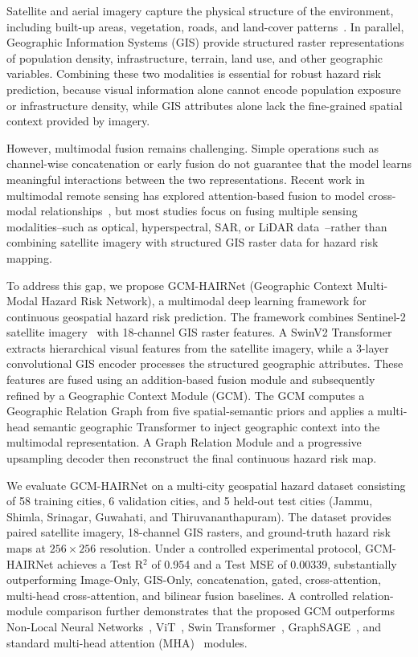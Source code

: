 \documentclass[sigconf, review=true]{acmart}
\begin{document}
Satellite and aerial imagery capture the physical structure of the environment, including built-up areas, vegetation, roads, and land-cover patterns~\cite{drusch2012sentinel}. In parallel, Geographic Information Systems (GIS) provide structured raster representations of population density, infrastructure, terrain, land use, and other geographic variables. Combining these two modalities is essential for robust hazard risk prediction, because visual information alone cannot encode population exposure or infrastructure density, while GIS attributes alone lack the fine-grained spatial context provided by imagery.

However, multimodal fusion remains challenging. Simple operations such as channel-wise concatenation or early fusion do not guarantee that the model learns meaningful interactions between the two representations. Recent work in multimodal remote sensing has explored attention-based fusion to model cross-modal relationships~\cite{bahaduri2024multimodal}, but most studies focus on fusing multiple sensing modalities--such as optical, hyperspectral, SAR, or LiDAR data~\cite{samadzadegan2025fusion}--rather than combining satellite imagery with structured GIS raster data for hazard risk mapping.

To address this gap, we propose GCM-HAIRNet (Geographic Context Multi-Modal Hazard Risk Network), a multimodal deep learning framework for continuous geospatial hazard risk prediction. The framework combines Sentinel-2 satellite imagery~\cite{drusch2012sentinel} with 18-channel GIS raster features. A SwinV2 Transformer~\cite{liu2022swinv2} extracts hierarchical visual features from the satellite imagery, while a 3-layer convolutional GIS encoder processes the structured geographic attributes. These features are fused using an addition-based fusion module and subsequently refined by a Geographic Context Module (GCM). The GCM computes a Geographic Relation Graph from five spatial-semantic priors and applies a multi-head semantic geographic Transformer to inject geographic context into the multimodal representation. A Graph Relation Module and a progressive upsampling decoder then reconstruct the final continuous hazard risk map.

We evaluate GCM-HAIRNet on a multi-city geospatial hazard dataset consisting of 58 training cities, 6 validation cities, and 5 held-out test cities (Jammu, Shimla, Srinagar, Guwahati, and Thiruvananthapuram). The dataset provides paired satellite imagery, 18-channel GIS rasters, and ground-truth hazard risk maps at $256\times256$ resolution. Under a controlled experimental protocol, GCM-HAIRNet achieves a Test R$^2$ of 0.954 and a Test MSE of 0.00339, substantially outperforming Image-Only, GIS-Only, concatenation, gated, cross-attention, multi-head cross-attention, and bilinear fusion baselines. A controlled relation-module comparison further demonstrates that the proposed GCM outperforms Non-Local Neural Networks~\cite{wang2018nonlocal}, ViT~\cite{dosovitskiy2021vit}, Swin Transformer~\cite{liu2021swin}, GraphSAGE~\cite{hamilton2017graphsage}, and standard multi-head attention (MHA)~\cite{vaswani2017attention} modules.
\end{document}
